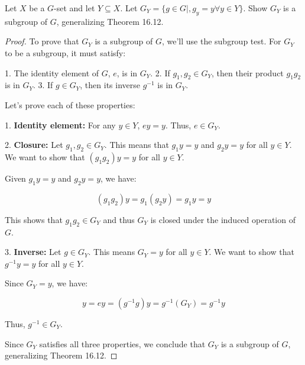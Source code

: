 \documentclass[12pt]{amsart}
\theoremstyle{definition}
\numberwithin{equation}{section}
\theoremstyle{plain}
\begin{document}
\begin{exercise}{12} Let $X$ be a $G$-set and let $Y \subseteq X$. Let $G_Y = \{g \in G \mid , g_y = y \forall y \in Y \}$. Show $G_Y$ is a subgroup of $G$, generalizing Theorem 16.12.
        
    \begin{proof}
        To prove that \( G_Y \) is a subgroup of \( G \), we'll use the subgroup test. For \( G_Y \) to be a subgroup, it must satisfy:

1. The identity element of \( G \), \( e \), is in \( G_Y \).
2. If \( g_1, g_2 \in G_Y \), then their product \( g_1g_2 \) is in \( G_Y \).
3. If \( g \in G_Y \), then its inverse \( g^{-1} \) is in \( G_Y \).

Let's prove each of these properties:

1. \textbf{Identity element:} For any \( y \in Y \), \( ey = y \). Thus, \( e \in G_Y \).

2. \textbf{Closure:} Let \( g_1, g_2 \in G_Y \). This means that \( g_1y = y \) and \( g_2y = y \) for all \( y \in Y \). We want to show that \( (g_1g_2)y = y \) for all \( y \in Y \).

Given \( g_1y = y \) and \( g_2y = y \), we have:

\[
(g_1g_2)y = g_1(g_2y) = g_1y = y
\]

This shows that \( g_1g_2 \in G_Y \) and thus \( G_Y \) is closed under the induced operation of \( G \).

3. \textbf{Inverse:} Let \( g \in G_Y \). This means \( G_Y = y \) for all \( y \in Y \). We want to show that \( g^{-1}y = y \) for all \( y \in Y \).

Since \( G_Y = y \), we have:

\[
y = ey = (g^{-1}g)y = g^{-1}(G_Y) = g^{-1}y
\]

Thus, \( g^{-1} \in G_Y \).

Since \( G_Y \) satisfies all three properties, we conclude that \( G_Y \) is a subgroup of \( G \), generalizing Theorem 16.12.
        \end{proof}
\end{exercise}
\vspace*{20pt}
\end{document}
